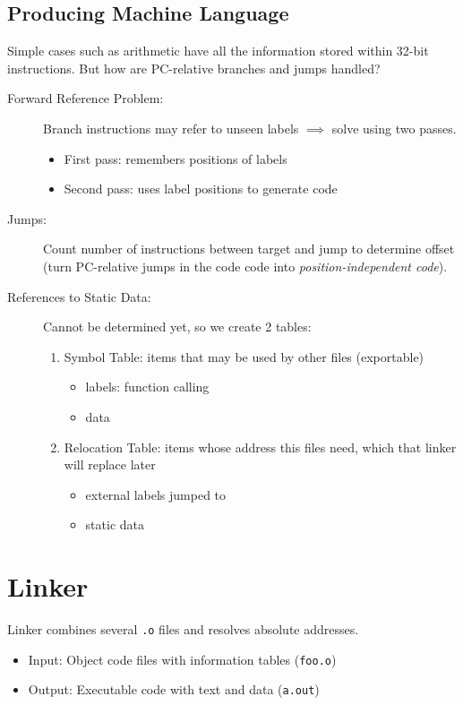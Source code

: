 \subsection{Producing Machine Language}
Simple cases such as arithmetic have all the information stored within 32-bit instructions. But how are PC-relative branches and jumps handled?
\begin{description}
    \item[Forward Reference Problem:] Branch instructions may refer to unseen labels $\implies$ solve using two passes.
    \begin{itemize}
        \item First pass: remembers positions of labels
        \item Second pass: uses label positions to generate code
    \end{itemize}
    \item[Jumps:] Count number of instructions between target and jump to determine offset (turn PC-relative jumps in the code code into \emph{position-independent code}).
    \item[References to Static Data:] Cannot be determined yet, so we create 2 tables:
    \begin{enumerate}
        \item Symbol Table: items that may be used by other files (exportable)
        \begin{itemize}
            \item labels: function calling
            \item data
        \end{itemize}
        \item Relocation Table: items whose address this files need, which that linker will replace later
        \begin{itemize}
            \item external labels jumped to
            \item static data
        \end{itemize}
    \end{enumerate}
\end{description}

\section{Linker}
Linker combines several \texttt{.o} files and resolves absolute addresses.
\begin{itemize}
    \item Input: Object code files with information tables (\texttt{foo.o})
    \item Output: Executable code with text and data (\texttt{a.out})
\end{itemize}

